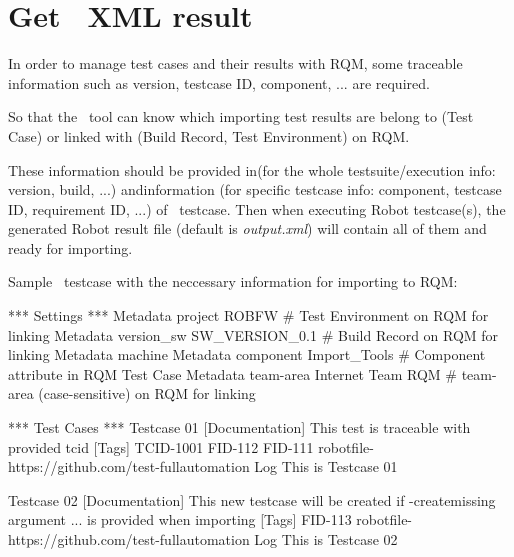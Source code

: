 



\hypertarget{description-get-robotframework-xml-result}{%
\section{Get \rfwcore\ XML result}
\label{description-get-robotframework-xml-result}}

In order to manage test cases and their results with RQM, some traceable
information such as version, testcase ID, component, ... are required.

So that the \pkg\ tool can know which importing test results are
belong to (Test Case) or linked with (Build Record, Test Environment) on RQM.

These information should be provided in(for the whole
testsuite/execution info: version, build, ...) and\rcode{{[}Tags{]}}information
(for specific testcase info: component, testcase ID, requirement ID, ...) of
\rfwcore\ testcase.
Then when executing Robot testcase(s), the generated Robot result file (default
is \emph{output.xml}) will contain all of them and ready for importing.

Sample \rfwcore\ testcase with the neccessary information for importing to RQM:

\begin{robotcode}[caption=Sample \rfwcore\ testcase,
                  linebackgroundcolor=\hlcode{2,3,4}]
*** Settings ***
Metadata   project      ROBFW             # Test Environment on RQM for linking
Metadata   version_sw   SW_VERSION_0.1    # Build Record on RQM for linking
Metadata   machine      %
Metadata   component    Import_Tools      # Component attribute in RQM Test Case
Metadata   team-area    Internet Team RQM  # team-area (case-sensitive) on RQM for linking

*** Test Cases ***
Testcase 01
   [Documentation]   This test is traceable with provided tcid
   [Tags]   TCID-1001   FID-112   FID-111    robotfile-https://github.com/test-fullautomation
   Log      This is Testcase 01

Testcase 02
   [Documentation]  This new testcase will be created if -createmissing argument
               ...  is provided when importing
   [Tags]   FID-113  robotfile-https://github.com/test-fullautomation
   Log      This is Testcase 02
\end{robotcode}

